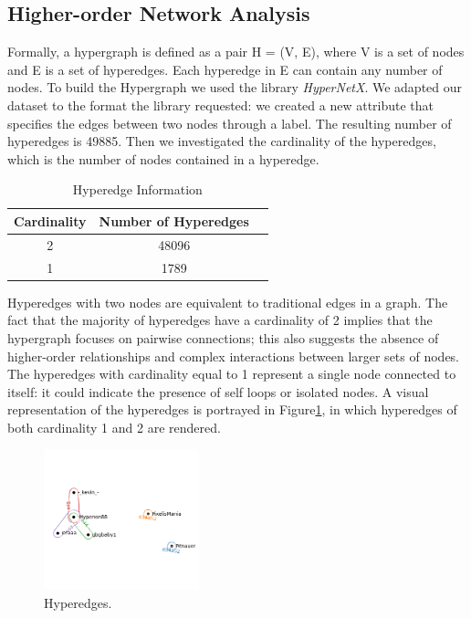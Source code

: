 \documentclass[sigchi]{acmart}
\begin{document}
\subsection{Higher-order Network Analysis}

Formally, a hypergraph is defined as a pair H = (V, E), where V is a set of nodes and E is a set of hyperedges. Each hyperedge in E can contain any number of nodes. To build the Hypergraph we used the library \textit{HyperNetX}\cite{doecode_22160}. We adapted our dataset to the format the library requested: we created a new attribute that specifies the edges between two nodes through a label. The resulting number of hyperedges is 49885. Then we investigated the cardinality of the hyperedges, which is the number of nodes contained in a hyperedge. 

\begin{table}[htbp]
\centering
\caption{Hyperedge Information}
\begin{tabular}{ccr}
\toprule
Cardinality & Number of Hyperedges \\
\midrule
2 & 48096 \\
1 & 1789 \\
\bottomrule
\end{tabular}
\end{table}


Hyperedges with two nodes are equivalent to traditional edges in a graph. The fact that the majority of hyperedges have a cardinality of 2 implies that the hypergraph focuses on pairwise connections; this also suggests the absence of higher-order relationships and complex interactions between larger sets of nodes. 
The hyperedges with cardinality equal to 1 represent a single node connected to itself: it could indicate the presence of self loops or isolated nodes. A visual representation of the hyperedges is portrayed in Figure\ref{fig:hypegrafi1}, in which hyperedges of both cardinality 1 and 2 are rendered.

\begin{figure}[htbp]
  \centering
  \includegraphics[width=0.4\textwidth]{hyperedges.png}
  \caption{Hyperedges.}
  \label{fig:hypegrafi1}
\end{figure}
\end{document}
